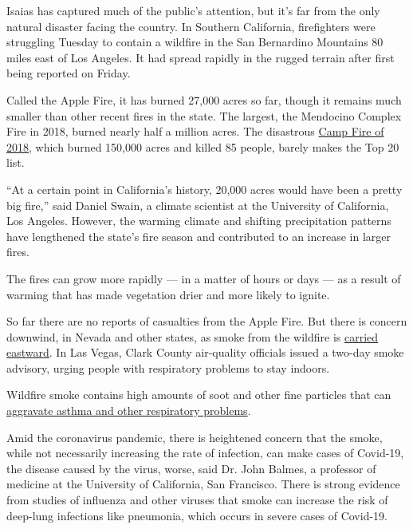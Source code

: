Isaias has captured much of the public's attention, but it's far from
the only natural disaster facing the country. In Southern California,
firefighters were struggling Tuesday to contain a wildfire in the San
Bernardino Mountains 80 miles east of Los Angeles. It had spread rapidly
in the rugged terrain after first being reported on Friday.

Called the Apple Fire, it has burned 27,000 acres so far, though it
remains much smaller than other recent fires in the state. The largest,
the Mendocino Complex Fire in 2018, burned nearly half a million acres.
The disastrous
\href{https://www.nytimes.com/interactive/2019/07/31/magazine/paradise-camp-fire-california.html}{Camp
Fire of 2018}, which burned 150,000 acres and killed 85 people, barely
makes the Top 20 list.

``At a certain point in California's history, 20,000 acres would have
been a pretty big fire,'' said Daniel Swain, a climate scientist at the
University of California, Los Angeles. However, the warming climate and
shifting precipitation patterns have lengthened the state's fire season
and contributed to an increase in larger fires.

The fires can grow more rapidly --- in a matter of hours or days --- as
a result of warming that has made vegetation drier and more likely to
ignite.

So far there are no reports of casualties from the Apple Fire. But there
is concern downwind, in Nevada and other states, as smoke from the
wildfire is
\href{https://rapidrefresh.noaa.gov/hrrr/HRRRsmoke/jsloopLocalDiskDateDomainZipTZA.cgi?dsKeys=hrrr_smoke_jet:\&runTime=2020080314\&plotName=trc1_t4sfc\&fcstInc=60\&numFcsts=49\&model=hrrr\&ptitle=HRRR-Smoke\%20Model\%20Fields\%20-\%20Experimental\&maxFcstLen=48\&fcstStrLen=-1\&resizePlot=1\&domain=t4}{carried
eastward}. In Las Vegas, Clark County air-quality officials issued a
two-day smoke advisory, urging people with respiratory problems to stay
indoors.

Wildfire smoke contains high amounts of soot and other fine particles
that can
\href{https://www.nytimes.com/2019/10/24/climate/california-wildfires-climate-change.html}{aggravate
asthma and other respiratory problems}.

Amid the coronavirus pandemic, there is heightened concern that the
smoke, while not necessarily increasing the rate of infection, can make
cases of Covid-19, the disease caused by the virus, worse, said Dr. John
Balmes, a professor of medicine at the University of California, San
Francisco. There is strong evidence from studies of influenza and other
viruses that smoke can increase the risk of deep-lung infections like
pneumonia, which occurs in severe cases of Covid-19.

